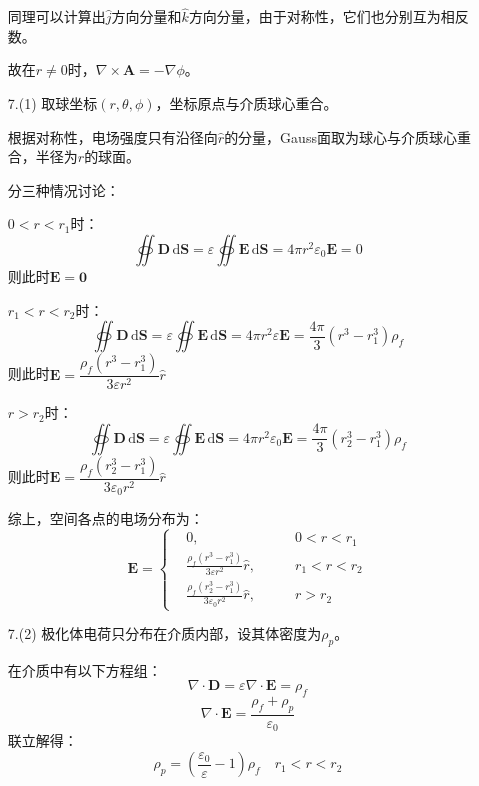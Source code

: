 \documentclass[a4paper,fontset=none]{ctexart}
\begin{document}
\begin{itemize}
        同理可以计算出$\hat{j}$方向分量和$\hat{k}$方向分量，由于对称性，它们也分别互为相反数。

        故在$r \neq 0$时，$\nabla\times\bm{A} = -\nabla\phi$。

        \item[7.(1)]
        取球坐标$(r,\theta,\phi)$，坐标原点与介质球心重合。

        根据对称性，电场强度只有沿径向$\hat{r}$的分量，Gauss面取为球心与介质球心重合，半径为$r$的球面。

        分三种情况讨论：

        $0 < r < r_1$时：
        \[
            \oiint \bm{D}\,\mathrm{d}\bm{S} = \varepsilon\oiint \bm{E}\,\mathrm{d}\bm{S} = 4\pi r^2\varepsilon_0\bm{E} = 0
        \]
        则此时$\bm{E} = \bm{0}$

        $r_1 < r < r_2$时：
        \[
            \oiint \bm{D}\,\mathrm{d}\bm{S} = \varepsilon\oiint \bm{E}\,\mathrm{d}\bm{S} = 4\pi r^2\varepsilon\bm{E} = \frac{4\pi}{3}(r^3 - r_1^3)\rho_f
        \]
        则此时$\bm{E} = \dfrac{\rho_f(r^3 - r_1^3)}{3\varepsilon r^2}\hat{r}$

        $r > r_2$时：
        \[
            \oiint \bm{D}\,\mathrm{d}\bm{S} = \varepsilon\oiint \bm{E}\,\mathrm{d}\bm{S} = 4\pi r^2\varepsilon_0\bm{E} = \frac{4\pi}{3}(r_2^3 - r_1^3)\rho_f
        \]
        则此时$\bm{E} = \dfrac{\rho_f(r_2^3 - r_1^3)}{3\varepsilon_0 r^2}\hat{r}$

        综上，空间各点的电场分布为：
        \[
            \bm{E} = \left\{
            \begin{aligned}
                & 0,\qquad& 0 < r < r_1 \\
                & \frac{\rho_f(r^3 - r_1^3)}{3\varepsilon r^2}\hat{r},\qquad& r_1 < r < r_2 \\
                & \frac{\rho_f(r_2^3 - r_1^3)}{3\varepsilon_0 r^2}\hat{r},\qquad& r > r_2
            \end{aligned}
        \right.
        \]

        \item[7.(2)]
        \textparagraph 极化体电荷只分布在介质内部，设其体密度为$\rho_p$。

        在介质中有以下方程组：
        \[
            \nabla\cdot\bm{D} = \varepsilon\nabla\cdot\bm{E} = \rho_f
        \]
        \[
            \nabla\cdot\bm{E} = \frac{\rho_f + \rho_p}{\varepsilon_0}
        \]
        联立解得：
        \[
            \rho_p = \left(\frac{\varepsilon_0}{\varepsilon} - 1\right)\rho_f \quad r_1 < r < r_2
        \]


\end{itemize}
\end{document}
